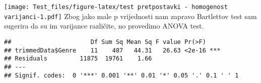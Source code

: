 \documentclass[
]{article}
\newenvironment{Shaded}{\begin{snugshade}}{\end{snugshade}}
\newcommand{\AttributeTok}[1]{\textcolor[rgb]{0.77,0.63,0.00}{#1}}
\newcommand{\CommentTok}[1]{\textcolor[rgb]{0.56,0.35,0.01}{\textit{#1}}}
\newcommand{\FunctionTok}[1]{\textcolor[rgb]{0.00,0.00,0.00}{#1}}
\newcommand{\NormalTok}[1]{#1}
\newcommand{\OtherTok}[1]{\textcolor[rgb]{0.56,0.35,0.01}{#1}}
\newcommand{\SpecialCharTok}[1]{\textcolor[rgb]{0.00,0.00,0.00}{#1}}
\begin{document}
\texttt{[image: Test\_files/figure-latex/test pretpostavki - homogenost varijanci-1.pdf]}
Zbog jako male p vrijednosti nam zapravo Bartlettov test sam sugerira da
su im varijance različite, no provedimo ANOVA test.

\begin{Shaded}
\end{Shaded}

\begin{verbatim}
##                      Df Sum Sq Mean Sq F value Pr(>F)    
## trimmedData$Genre    11    487   44.31   26.63 <2e-16 ***
## Residuals         11875  19761    1.66                   
## ---
## Signif. codes:  0 '***' 0.001 '**' 0.01 '*' 0.05 '.' 0.1 ' ' 1
\end{verbatim}

\begin{Shaded}
\end{Shaded}
\end{document}

